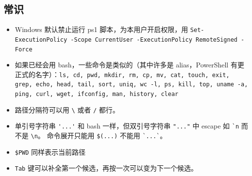 
\subsection{常识}
\begin{itemize}
\item Windows 默认禁止运行 ps1 脚本，为本用户开启权限，用 \verb`Set-ExecutionPolicy -Scope CurrentUser -ExecutionPolicy RemoteSigned -Force`
\item 如果已经会用 bash，一些命令是类似的（其中许多是 alias，PowerShell 有更正式的名字）：\verb`ls, cd, pwd, mkdir, rm, cp, mv, cat, touch, exit, grep, echo, head, tail, sort, uniq, wc -l, ps, kill, top, uname -a, ping, curl, wget, ifconfig, man, history, clear`
\item 路径分隔符可以用 \verb`\` 或者 \verb`/` 都行。
\item 单引号字符串 \verb`'...'` 和 bash 一样，但双引号字符串 \verb`"..."` 中 escape 如 \verb|`n| 而不是 \verb`\n`。 命令展开只能用 \verb`$(...)` 不能用 \verb|`...`|。
\item \verb`$PWD` 同样表示当前路径
\item \verb`Tab` 键可以补全第一个候选，再按一次可以变为下一个候选。
\end{itemize}

